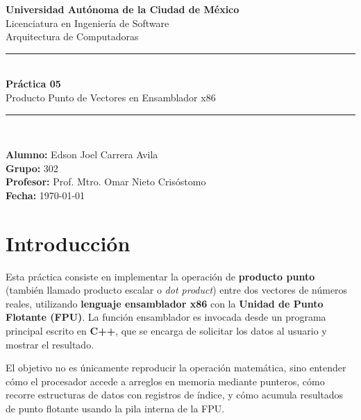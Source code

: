 \documentclass[12pt, letterpaper]{article}
\begin{document}
\begin{titlepage}
    \centering
    \vspace*{1.5cm}

    {\Large \textbf{Universidad Autónoma de la Ciudad de México}}\\[0.3cm]
    {\large Licenciatura en Ingeniería de Software}\\[0.2cm]
    {\large Arquitectura de Computadoras}\\[2.5cm]

    \rule{\linewidth}{0.5pt}\\[0.4cm]
    {\LARGE \bfseries Práctica 05}\\[0.3cm]
    {\Large Producto Punto de Vectores en Ensamblador x86}\\[0.3cm]
    \rule{\linewidth}{0.5pt}\\[2cm]

    \begin{flushleft}
        \textbf{Alumno:} Edson Joel Carrera Avila \\[0.3cm]
        \textbf{Grupo:} 302 \\[0.3cm]
        \textbf{Profesor:} Prof. Mtro. Omar Nieto Crisóstomo \\[0.3cm]
        \textbf{Fecha:} \today
    \end{flushleft}
    \vfill
\end{titlepage}

\tableofcontents
\newpage

\section{Introducción}

Esta práctica consiste en implementar la operación de \textbf{producto punto} (también llamado producto escalar o \textit{dot product}) entre dos vectores de números reales, utilizando \textbf{lenguaje ensamblador x86} con la \textbf{Unidad de Punto Flotante (FPU)}. La función ensamblador es invocada desde un programa principal escrito en \textbf{C++}, que se encarga de solicitar los datos al usuario y mostrar el resultado.

El objetivo no es únicamente reproducir la operación matemática, sino entender cómo el procesador accede a arreglos en memoria mediante punteros, cómo recorre estructuras de datos con registros de índice, y cómo acumula resultados de punto flotante usando la pila interna de la FPU.
\end{document}
